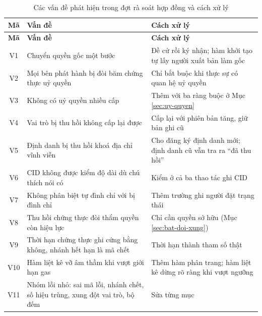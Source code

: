 \begin{longtable}{|c|p{5.4cm}|p{7.4cm}|}
\caption{Các vấn đề phát hiện trong đợt rà soát hợp đồng và cách xử lý}
\label{tab:v2-audit} \\
\hline
\textbf{Mã} & \textbf{Vấn đề} & \textbf{Cách xử lý} \\ \hline
\endfirsthead
\hline
\textbf{Mã} & \textbf{Vấn đề} & \textbf{Cách xử lý} \\ \hline
\endhead
V1 & Chuyển quyền gốc một bước & Đề cử rồi ký nhận; hàm khởi tạo tự lấy người xuất bản làm gốc \\ \hline
V2 & Mọi bên phát hành bị đòi băm chứng thực uỷ quyền & Chỉ bắt buộc khi thực sự có quan hệ uỷ quyền \\ \hline
V3 & Không có uỷ quyền nhiều cấp & Thêm với ba ràng buộc ở Mục \ref{sec:uy-quyen} \\ \hline
V4 & Vai trò bị thu hồi không cấp lại được & Cấp lại với phiên bản tăng, giữ bản ghi cũ \\ \hline
V5 & Định danh bị thu hồi khoá địa chỉ vĩnh viễn & Cho đăng ký định danh mới; định danh cũ vẫn tra ra ``đã thu hồi'' \\ \hline
V6 & CID không được kiểm độ dài dù chú thích nói có & Kiểm ở cả ba thao tác ghi CID \\ \hline
V7 & Không phân biệt tự đình chỉ với bị đình chỉ & Thêm trường ghi người đặt trạng thái \\ \hline
V8 & Thu hồi chứng thực đòi thẩm quyền còn hiệu lực & Chỉ cần quyền sở hữu (Mục \ref{sec:bat-doi-xung}) \\ \hline
V9 & Thời hạn chứng thực ghi cứng bằng không, nhánh hết hạn là mã chết & Thời hạn thành tham số thật \\ \hline
V10 & Hàm liệt kê vỡ âm thầm khi vượt giới hạn gas & Thêm hàm phân trang; hàm liệt kê dừng rõ ràng khi vượt ngưỡng \\ \hline
V11 & Nhóm lỗi nhỏ: sai mã lỗi, nhánh chết, số hiệu trùng, xung đột vai trò, bộ đếm & Sửa từng mục \\ \hline
\end{longtable}
